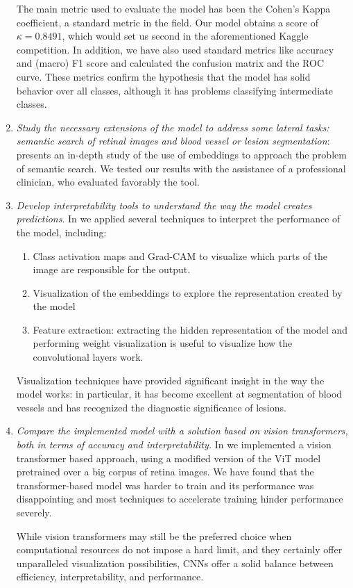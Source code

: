 \begin{enumerate}[label=(O\arabic*)]
    The main metric used to evaluate the model has been the Cohen's Kappa coefficient, a standard metric in the field. Our model obtains a score of \( \kappa = 0.8491\), which would set us second in the aforementioned Kaggle competition. In addition, we have also used standard metrics like accuracy and (macro) F1 score and calculated the confusion matrix and the ROC curve. These metrics confirm the hypothesis that the model has solid behavior over all classes, although it has problems classifying intermediate classes.
    \item \textit{Study the necessary extensions of the model to address some lateral tasks: semantic search of retinal images and blood vessel or lesion segmentation}:  presents an in-depth study of the use of embeddings to approach the problem of semantic search. We tested our results with the assistance of a professional clinician, who evaluated favorably the tool.
    \item \textit{Develop interpretability tools to understand the way the model creates predictions}. In  we applied several techniques to interpret the performance of the model, including:
    \begin{enumerate}
        \item Class activation maps and Grad-CAM to visualize which parts of the image are responsible for the output.
        \item Visualization of the embeddings to explore the representation created by the model
        \item Feature extraction: extracting the hidden representation of the model and performing weight visualization is useful to visualize how the convolutional layers work. 
    \end{enumerate}
    Visualization techniques have provided significant insight in the way the model works: in particular, it has become excellent at segmentation of blood vessels and has recognized the diagnostic significance of lesions. 
    \item \textit{Compare the implemented model with a solution based on \textit{vision transformers}, both in terms of accuracy and interpretability.} In  we implemented a vision transformer based approach, using a modified version of the ViT model pretrained over a big corpus of retina images. We have found that the transformer-based model was harder to train and its performance was disappointing and most techniques to accelerate training hinder performance severely.
    
    While vision transformers may still be the preferred choice when computational resources do not impose a hard limit, and they certainly offer unparalleled visualization possibilities, CNNs offer a solid balance between efficiency, interpretability, and performance.
\end{enumerate}

